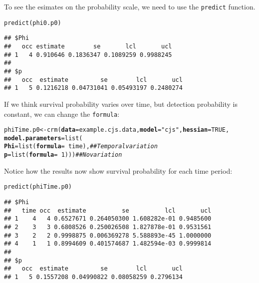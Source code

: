 \documentclass[12pt]{article}\usepackage[]{graphicx}\usepackage[]{color}
\makeatletter
\newcommand{\hlnum}[1]{\textcolor[rgb]{0.69,0.494,0}{#1}}%
\newcommand{\hlstr}[1]{\textcolor[rgb]{0.749,0.012,0.012}{#1}}%
\newcommand{\hlcom}[1]{\textcolor[rgb]{0.514,0.506,0.514}{\textit{#1}}}%
\newcommand{\hlopt}[1]{\textcolor[rgb]{0,0,0}{#1}}%
\newcommand{\hlstd}[1]{\textcolor[rgb]{0,0,0}{#1}}%
\newcommand{\hlkwb}[1]{\textcolor[rgb]{0,0.341,0.682}{#1}}%
\newcommand{\hlkwc}[1]{\textcolor[rgb]{0,0,0}{\textbf{#1}}}%
\newcommand{\hlkwd}[1]{\textcolor[rgb]{0.004,0.004,0.506}{#1}}%
\newenvironment{kframe}{%
 \def\at@end@of@kframe{}%
 \ifinner\ifhmode%
  \def\at@end@of@kframe{\end{minipage}}%
  \begin{minipage}{\columnwidth}%
 \fi\fi%
 \def\FrameCommand##1{\hskip\@totalleftmargin \hskip-\fboxsep
 \colorbox{shadecolor}{##1}\hskip-\fboxsep
     \hskip-\linewidth \hskip-\@totalleftmargin \hskip\columnwidth}%
 \MakeFramed {\advance\hsize-\width
   \@totalleftmargin\z@ \linewidth\hsize
   \@setminipage}}%
 {\par\unskip\endMakeFramed%
 \at@end@of@kframe}
\newenvironment{knitrout}{}{} %
\newcommand{\inr}[1]{\colorbox{inlinecolor}{\texttt{#1}}}
\makeatother
\begin{document}
To see the esimates on the probability scale, we need to use the
\inr{predict} function.

\begin{knitrout}
\color{fgcolor}\begin{kframe}
\begin{alltt}
\hlkwd{predict}\hlstd{(phi0.p0)}
\end{alltt}
\begin{verbatim}
## $Phi
##   occ estimate        se       lcl       ucl
## 1   4 0.910646 0.1836347 0.1089259 0.9988245
## 
## $p
##   occ  estimate         se        lcl       ucl
## 1   5 0.1216218 0.04731041 0.05493197 0.2480274
\end{verbatim}
\end{kframe}
\end{knitrout}


If we think survival probability varies over time, but detection
probability is constant, we can change the \texttt{formula}:


\begin{knitrout}
\color{fgcolor}\begin{kframe}
\begin{alltt}
\hlstd{phiTime.p0} \hlkwb{<-} \hlkwd{crm}\hlstd{(}\hlkwc{data}\hlstd{=example.cjs.data,} \hlkwc{model}\hlstd{=}\hlstr{"cjs"}\hlstd{,} \hlkwc{hessian}\hlstd{=}\hlnum{TRUE}\hlstd{,}
                  \hlkwc{model.parameters}\hlstd{=}\hlkwd{list}\hlstd{(}
                      \hlkwc{Phi}\hlstd{=}\hlkwd{list}\hlstd{(}\hlkwc{formula}\hlstd{=}\hlopt{~}\hlstd{time),}  \hlcom{## Temporal variation}
                      \hlkwc{p}\hlstd{=}\hlkwd{list}\hlstd{(}\hlkwc{formula}\hlstd{=}\hlopt{~}\hlnum{1}\hlstd{)))}      \hlcom{## No variation}
\end{alltt}
\end{kframe}
\end{knitrout}

Notice how the results now show survival probability for each time period:

\begin{knitrout}
\color{fgcolor}\begin{kframe}
\begin{alltt}
\hlkwd{predict}\hlstd{(phiTime.p0)}
\end{alltt}
\begin{verbatim}
## $Phi
##   time occ  estimate          se          lcl       ucl
## 1    4   4 0.6527671 0.264050300 1.608282e-01 0.9485600
## 2    3   3 0.6808526 0.250026508 1.827878e-01 0.9531561
## 3    2   2 0.9998875 0.006369278 5.588893e-45 1.0000000
## 4    1   1 0.8994609 0.401574687 1.482594e-03 0.9999814
## 
## $p
##   occ  estimate         se        lcl       ucl
## 1   5 0.1557208 0.04990822 0.08058259 0.2796134
\end{verbatim}
\end{kframe}
\end{knitrout}
\end{document}
